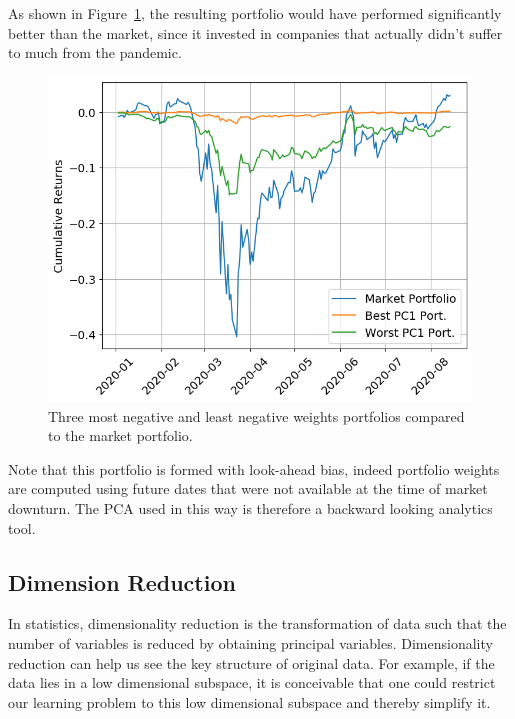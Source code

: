 As shown in Figure~\ref{fig:pca_covid_return}, the resulting portfolio would have performed significantly better than the market, since it invested in companies that actually didn't suffer to much from the pandemic. 

\begin{figure}[bhtp]
\centering
\includegraphics[width=.7\textwidth]{figures/pc1_weights_covid_returns}
\caption{Three most negative and least negative weights portfolios compared to the market portfolio.}
\label{fig:pca_covid_return}
\end{figure}

Note that this portfolio is formed with look-ahead bias, indeed portfolio weights are computed using future dates that were not available at the time of market downturn. The PCA used in this way is therefore a backward looking analytics tool.
































\subsection{Dimension Reduction}
In statistics, dimensionality reduction is the transformation of data such that the number of variables is reduced by obtaining principal variables. Dimensionality reduction can help us see the key structure of original data. For example, if the data lies in a low dimensional subspace, it is conceivable that one could restrict our learning problem to this low dimensional subspace and thereby simplify it.

